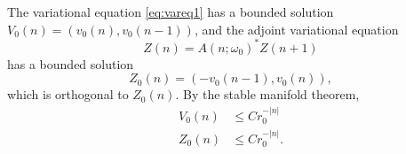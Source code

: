 \documentclass[12pt,reqno]{amsart}
\begin{document}
The variational equation \cref{eq:vareq1} has a bounded solution $V_0(n) = (v_0(n), v_0(n-1))$, and the adjoint variational equation 
\begin{equation}\label{eq:adjvareq1}
	Z(n) = A(n; \omega_0)^* Z(n+1)
\end{equation}
has a bounded solution 
\begin{equation}\label{eq:Z0}
	Z_0(n) = (-v_0(n-1), v_0(n)),
\end{equation}
which is orthogonal to $Z_0(n)$. By the stable manifold theorem,
\begin{equation}\label{eq:VZ0estimates}
	\begin{aligned}
		V_0(n) &\leq C r_0^{-|n|} \\
		Z_0(n) &\leq C r_0^{-|n|}.
	\end{aligned}
\end{equation}
\end{document}
